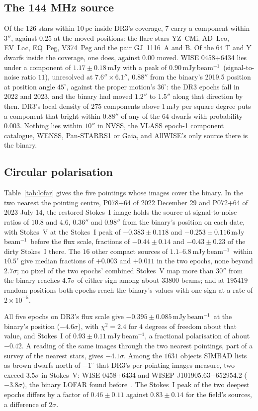 \documentclass[3p,11pt]{elsarticle}
\newcommand{\mJyb}{mJy\,beam$^{-1}$}
\newcommand{\sci}[2]{#1\times10^{#2}}
\begin{document}
\subsection{The 144 MHz source}

Of the $126$ stars within $10$\,pc inside DR3's coverage, $7$ carry a component within
$3''$, against $0.25$ at the moved positions: the flare stars YZ~CMi, AD~Leo, EV~Lac,
EQ~Peg, V374~Peg and the pair GJ~1116~A and B. Of the $64$ T and Y dwarfs inside the
coverage, one does, against $0.00$ moved. WISE 0458+6434 lies under a component of
$1.17\pm0.18$\,mJy with a peak of $0.90$\,\mJyb\ (signal-to-noise ratio $11$),
unresolved at $7.6''\times6.1''$, $0.88''$ from the binary's 2019.5 position at position
angle $45^\circ$, against the proper motion's $36^\circ$: the DR3 epochs fall in 2022 and
2023, and the binary had moved $1.2''$ to $1.5''$ along that direction by then. DR3's
local density of $275$ components above $1$\,mJy per square degree puts a component that
bright within $0.88''$ of any of the $64$ dwarfs with probability $0.003$. Nothing lies
within $10''$ in NVSS, the VLASS epoch-1 component catalogue, WENSS, Pan-STARRS1 or Gaia,
and AllWISE's only source there is the binary.

\subsection{Circular polarisation}

Table~\ref{tab:lofar} gives the five pointings whose images cover the binary. In the two
nearest the pointing centre, P078+64 of 2022 December 29 and P072+64 of 2023 July 14, the
restored Stokes~I image holds the source at signal-to-noise ratios of $10.8$ and $4.6$,
$0.36''$ and $0.98''$ from the binary's position on each date, with Stokes~V at the
Stokes~I peak of $-0.383\pm0.118$ and $-0.253\pm0.116$\,\mJyb\ before the flux scale,
fractions of $-0.44\pm0.14$ and $-0.43\pm0.23$ of the dirty Stokes~I there. The $16$
other compact sources of $1.1$--$6.8$\,\mJyb\ within $10.5'$ give median fractions of
$+0.003$ and $+0.011$ in the two epochs, none beyond $2.7\sigma$; no pixel of the two
epochs' combined Stokes~V map more than $30''$ from the binary reaches $4.7\sigma$ of
either sign among about $33800$ beams; and at $195419$ random positions both epochs reach
the binary's values with one sign at a rate of $\sci{2}{-5}$.

All five epochs on DR3's flux scale give $-0.395\pm0.085$\,\mJyb\ at the binary's
position ($-4.6\sigma$), with $\chi^2=2.4$ for $4$ degrees of freedom about that value,
and Stokes~I of $0.93\pm0.11$\,\mJyb, a fractional polarisation of about $-0.42$. A
reading of the same images through the two nearest pointings, part of a survey of the
nearest stars, gives $-4.1\sigma$. Among the $1631$ objects SIMBAD lists as brown dwarfs
north of $-1^\circ$ that DR3's per-pointing images measure, two exceed $3.5\sigma$ in
Stokes~V: WISE 0458+6434 and WISEP J101905.63+652954.2 ($-3.8\sigma$), the binary LOFAR
found before~\cite{Vedantham2023}. The Stokes~I peak of the two deepest epochs differs by
a factor of $0.46\pm0.11$ against $0.83\pm0.14$ for the field's sources, a difference of
$2\sigma$.
\end{document}
